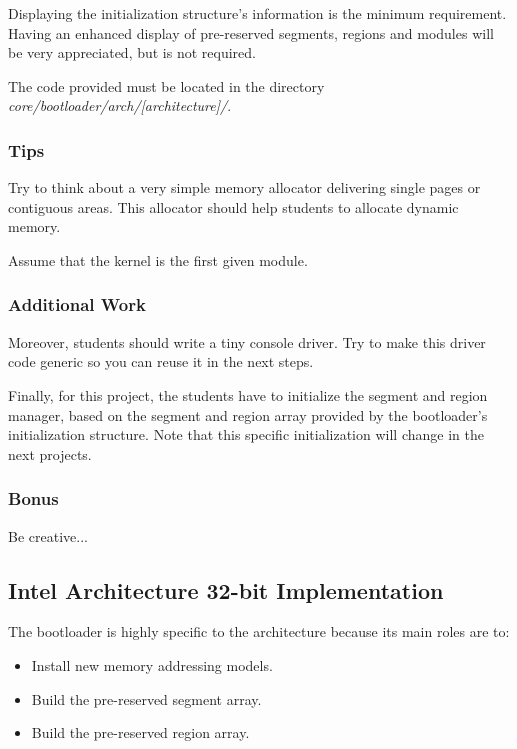 Displaying the initialization structure's information is the
minimum requirement. Having an enhanced display of pre-reserved
segments, regions and modules will be very appreciated, but is not required.

The code provided must be located in the directory
\textit{core/bootloader/arch/[architecture]/}.

\subsubsection{Tips}

Try to think about a very simple memory allocator delivering single
pages or contiguous areas. This allocator should help students to
allocate dynamic memory.

Assume that the kernel is the first given module.

\subsubsection{Additional Work}

Moreover, students should write a tiny console driver. Try to make this
driver code generic so you can reuse it in the next steps.

Finally, for this project, the students have to initialize the segment
and region manager, based on the segment and region array provided by
the bootloader's initialization structure. Note that this specific
initialization will change in the next projects.

\subsubsection{Bonus}

Be creative...

%
%

\subsection{Intel Architecture 32-bit Implementation}

The bootloader is highly specific to the architecture because its main
roles are to:

\begin{itemize}
  \item
    Install new memory addressing models.
  \item
    Build the pre-reserved segment array.
  \item
    Build the pre-reserved region array.
\end{itemize}

